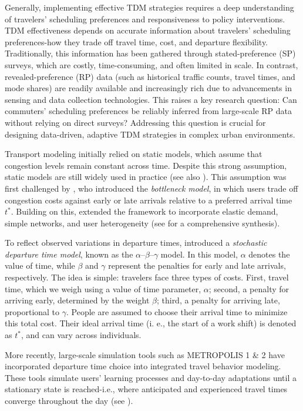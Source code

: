 Generally, implementing effective TDM strategies requires a deep understanding of travelers' scheduling preferences and responsiveness to policy interventions. TDM effectiveness depends on accurate information about travelers' scheduling preferences-how they trade off travel time, cost, and departure flexibility. Traditionally, this information has been gathered through stated-preference (SP) surveys, which are costly, time-consuming, and often limited in scale. In contrast, revealed-preference (RP) data (such as historical traffic counts, travel times, and mode shares) are readily available and increasingly rich due to advancements in sensing and data collection technologies. This raises a key research question: Can commuters' scheduling preferences be reliably inferred from large-scale RP data without relying on direct surveys? Addressing this question is crucial for designing data-driven, adaptive TDM strategies in complex urban environments.

Transport modeling initially relied on static models, which assume that congestion levels remain constant across time. Despite this strong assumption, static models are still widely used in practice (see also \textcite{duranton2011fundamental}). This assumption was first challenged by \textcite{Vickrey1963, Vickrey1969}, who introduced the \textit{bottleneck model}, in which users trade off congestion costs against early or late arrivals relative to a preferred arrival time \( t^* \). Building on this, \textcite{arnott1993structural} extended the framework to incorporate elastic demand, simple networks, and user heterogeneity (see \textcite{Li2020} for a comprehensive synthesis).

To reflect observed variations in departure times, \textcite{de1983stochastic} introduced a \textit{stochastic departure time model}, known as the \(\alpha\)–\(\beta\)–\(\gamma\) model. In this model, \(\alpha\) denotes the value of time, while \(\beta\) and \(\gamma\) represent the penalties for early and late arrivals, respectively. The idea is simple: travelers face three types of costs. First, travel time, which we weigh using a value of time parameter,  \(\alpha\);
second, a penalty for arriving early, determined by the weight \(\beta\);
third, a penalty for arriving late, proportional to \(\gamma\).
People are assumed to choose their arrival time to minimize this total cost.
Their ideal arrival time (i. e., the start of a work shift) is denoted as $t^*$, and can vary across individuals. 

More recently, large-scale simulation tools such as METROPOLIS 1 \& 2 have incorporated departure time choice into integrated travel behavior modeling. These tools simulate users' learning processes and day-to-day adaptations until a stationary state is reached-i.e., where anticipated and experienced travel times converge throughout the day (see \textcite{javaudin2024metropolis2}).

